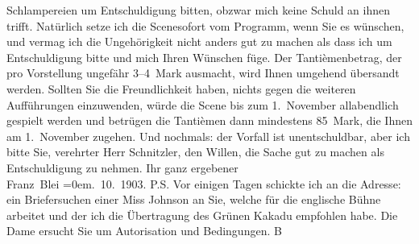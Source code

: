 \begin{ledgroupsized}[t]{13cm}
               Schlampereien um Entschuldigung bitten, obzwar mich keine Schuld an ihnen trifft.
               Natürlich setze ich die Scenesofort vom Programm, wenn Sie es wünschen, und
               vermag ich die Ungehörigkeit {\pb}nicht anders gut zu machen als
               dass ich um Entschuldigung bitte und mich Ihren Wünschen füge. Der Tantièmenbetrag,
               der pro Vorstellung ungefähr 3–4 Mark ausmacht, wird Ihnen umgehend übersandt werden.
               Sollten Sie die Freundlichkeit \introOben{}haben\introOben{}, nichts gegen die
               weiteren Aufführungen einzuwenden, würde die Scene bis zum 1. November allabendlich
               gespielt werden und betrügen die Tantièmen dann mindestens 85 Mark, die Ihnen am
                  1. November zugehen.\pend
           \pstart
           Und nochmals: der Vorfall ist unentschuldbar, aber ich bitte Sie, verehrter Herr
               Schnitzler, den Willen, die Sache gut zu machen als Entschuldigung zu nehmen.\pend
           \pstart
           Ihr ganz ergebener{\\[\baselineskip]}\spacefill\mbox{Franz Blei}\pend
           \leftskip=0em{}. 10. 1903.\pend
           \pstart
           P.S. Vor einigen Tagen schickte ich an die Adresse: \label{K_L01329_1v}\label{K_L01329_1h} ein Briefersuchen
                  einer Miss Johnson an Sie, welche für die
                     englische Bühne arbeitet und der ich die
                  Übertragung des {\pb}Grünen Kakadu empfohlen habe. Die Dame
                  ersucht Sie um Autorisation und Bedingungen. \spacefill\mbox{B}\pend
           
         
         \endnumbering{}\end{ledgroupsized}  \newcommand{\dateiname}{L01329}\newcommand{\titel}{Franz Blei an Arthur Schnitzler, 17. 10. 1903}\newcommand{\editorInnen}{Martin Anton Müller und Gerd-Hermann Susen}
      